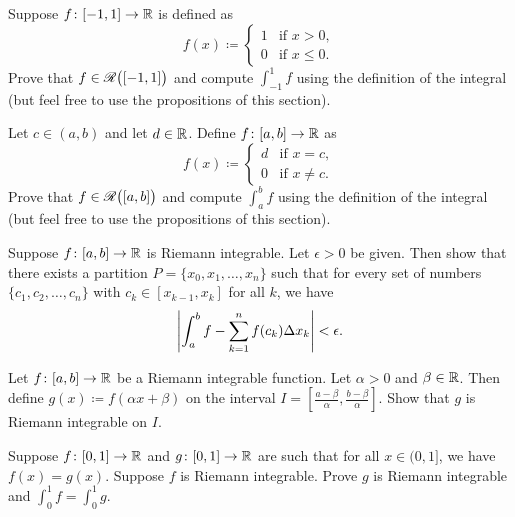 \begin{exercise}
Suppose $f \colon [-1,1] \to {\mathbb{R}}$ is defined as
\begin{equation*}
f(x) \coloneqq
\begin{cases}
1 & \text{if } x > 0, \\
0 & \text{if } x \leq 0.
\end{cases}
\end{equation*}
Prove that $f \in {\mathscr{R}}\bigl([-1,1]\bigr)$ and
compute $\int_{-1}^1 f$ using the definition of the integral
(but
feel free to use the propositions of this section).
\end{exercise}

\begin{exercise}
Let $c \in (a,b)$ and let $d \in {\mathbb{R}}$.
Define $f \colon [a,b] \to {\mathbb{R}}$ as
\begin{equation*}
f(x) \coloneqq
\begin{cases}
d & \text{if } x = c, \\
0 & \text{if } x \neq c.
\end{cases}
\end{equation*}
Prove that $f \in {\mathscr{R}}\bigl([a,b]\bigr)$ and
compute
$\int_a^b f$ using the definition of the integral
(but
feel free to use the propositions of this section).
\end{exercise}

\begin{exercise} \label{exercise:taggedpartition}
Suppose $f \colon [a,b] \to {\mathbb{R}}$ is Riemann integrable.  Let $\epsilon
> 0$ be given.  Then show that there exists a partition $P = \{ x_0, x_1,
\ldots, x_n \}$
such that for every
set of numbers $\{ c_1, c_2, \ldots, c_n \}$ with
$c_k \in [x_{k-1},x_k]$ for all $k$, we have
\begin{equation*}
\left\lvert {\int_a^b f - \sum_{k=1}^n f(c_k) \Delta x_k} \right\rvert < \epsilon .
\end{equation*}
\end{exercise}

\begin{exercise}
Let $f \colon [a,b] \to {\mathbb{R}}$ be a Riemann integrable function.
Let $\alpha > 0$ and $\beta \in {\mathbb{R}}$.
Then define $g(x) \coloneqq f(\alpha x + \beta)$ on the interval
$I = [\frac{a-\beta}{\alpha}, \frac{b-\beta}{\alpha}]$.  Show
that $g$ is Riemann integrable on $I$.
\end{exercise}

\begin{exercise}
Suppose $f \colon [0,1] \to {\mathbb{R}}$ and $g \colon [0,1] \to {\mathbb{R}}$
are such that for all $x \in (0,1]$,
we have $f(x) = g(x)$.  Suppose $f$ is Riemann integrable. 
Prove $g$ is Riemann integrable and $\int_{0}^1 f = \int_{0}^1 g$.
\end{exercise}

